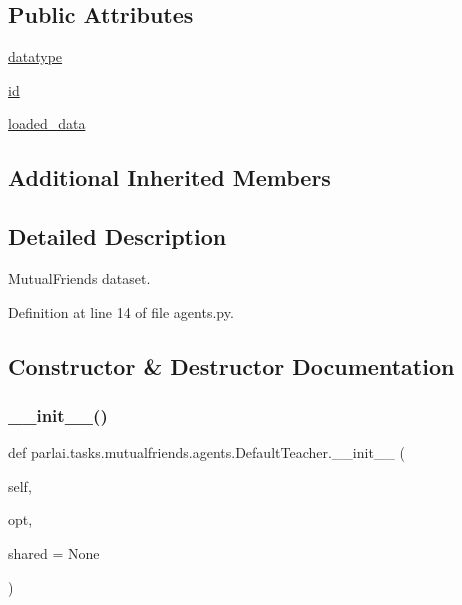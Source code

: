\subsection*{Public Attributes}
\begin{DoxyCompactItemize}
\item 
\hyperlink{classparlai_1_1tasks_1_1mutualfriends_1_1agents_1_1DefaultTeacher_a72fe5fce4948609f6744730626aef8b1}{datatype}
\item 
\hyperlink{classparlai_1_1tasks_1_1mutualfriends_1_1agents_1_1DefaultTeacher_a61d23236d8ab996b4bc7c72d4f966ba9}{id}
\item 
\hyperlink{classparlai_1_1tasks_1_1mutualfriends_1_1agents_1_1DefaultTeacher_a36b8bfe95e840334f7db7fe93f54c646}{loaded\+\_\+data}
\end{DoxyCompactItemize}
\subsection*{Additional Inherited Members}


\subsection{Detailed Description}
\begin{DoxyVerb}MutualFriends dataset.\end{DoxyVerb}
 

Definition at line 14 of file agents.\+py.



\subsection{Constructor \& Destructor Documentation}
\mbox{\label{classparlai_1_1tasks_1_1mutualfriends_1_1agents_1_1DefaultTeacher_a61e000a690cb89a9c8fe20692d1f8106}} 
\subsubsection{\texorpdfstring{\+\_\+\+\_\+init\+\_\+\+\_\+()}{\_\_init\_\_()}}
{\footnotesize\ttfamily def parlai.\+tasks.\+mutualfriends.\+agents.\+Default\+Teacher.\+\_\+\+\_\+init\+\_\+\+\_\+ (\begin{DoxyParamCaption}\item[{}]{self,  }\item[{}]{opt,  }\item[{}]{shared = {\ttfamily None} }\end{DoxyParamCaption})}




